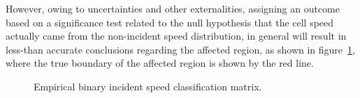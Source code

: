 \documentclass[12pt]{report}
\newcommand{\inputTikZ}[1]{%
    \begin{singlespace}
    \end{singlespace}
  }
\newcommand{\inputTikZ}[1]{%
    \begin{singlespace}
    \beginpgfgraphicnamed{#1-external}%
    \endpgfgraphicnamed%
    \end{singlespace}
  }
\newcounter{time}
\newcounter{space}
\begin{document}
However, owing to uncertainties and other externalities, assigning an
outcome based on a significance test related to the null hypothesis
that the cell speed actually came from the non-incident speed
distribution, in general will result in less-than accurate conclusions
regarding the affected region, as shown in
figure~\ref{fig:incident-speed-classification-binary-dirty}, where the
true boundary of the affected region is shown by the red line.
\begin{figure}[t]
  \begin{center}
    \inputTikZ{figs/time-space-incident-schematic-binary-dirty}
    \caption[Empirical binary incident speed classification
    matrix]{Empirical binary incident speed classification matrix.}
    \label{fig:incident-speed-classification-binary-dirty}
  \end{center}
\end{figure}
\end{document}

